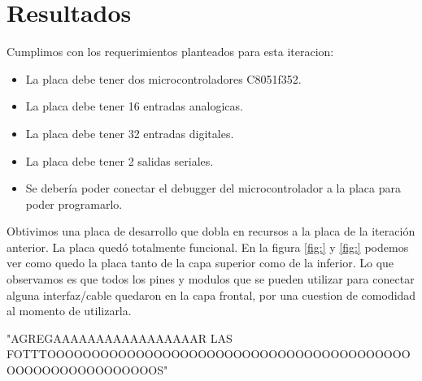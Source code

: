 
\section{Resultados} %
\label{sec:resultados}

Cumplimos con los requerimientos planteados para esta iteracion:

\begin{itemize}
  \item La placa debe tener dos microcontroladores C8051f352.
  \item La placa debe tener 16 entradas analogicas.
  \item La placa debe tener 32 entradas digitales.
  \item La placa debe tener 2 salidas seriales. 
  \item Se debería poder conectar el debugger del microcontrolador a la placa para poder programarlo.
\end{itemize}


 Obtivimos una placa de desarrollo que dobla en recursos a la placa de la iteración anterior. La placa quedó totalmente funcional.
En la figura \ref{fig:} y \ref{fig:} podemos ver como quedo la placa tanto de la capa superior como de la inferior. Lo que observamos es que todos los pines y modulos que se pueden utilizar para conectar alguna interfaz/cable quedaron en la capa frontal, por una cuestion de comodidad al momento de utilizarla.

"AGREGAAAAAAAAAAAAAAAAAR LAS FOTTTOOOOOOOOOOOOOOOOOOOOOOOOOOOOOOOOOOOOOOOOOOOOOOOOOOOOOOOOOOS"


